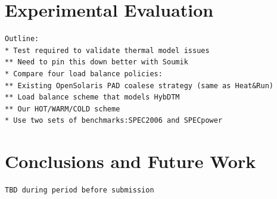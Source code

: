 \documentclass[times,12pt,onecolumn]{article}
\begin{document}
\section{Experimental Evaluation}
\label{sec:experiment}

\begin{verbatim}
Outline:
* Test required to validate thermal model issues
** Need to pin this down better with Soumik
* Compare four load balance policies:
** Existing OpenSolaris PAD coalese strategy (same as Heat&Run)
** Load balance scheme that models HybDTM
** Our HOT/WARM/COLD scheme
* Use two sets of benchmarks:SPEC2006 and SPECpower
\end{verbatim}

\section{Conclusions and Future Work}
\label{sec:conclusions}

\begin{verbatim}
TBD during period before submission
\end{verbatim}
\label{sec:references}
\small


\end{document}

